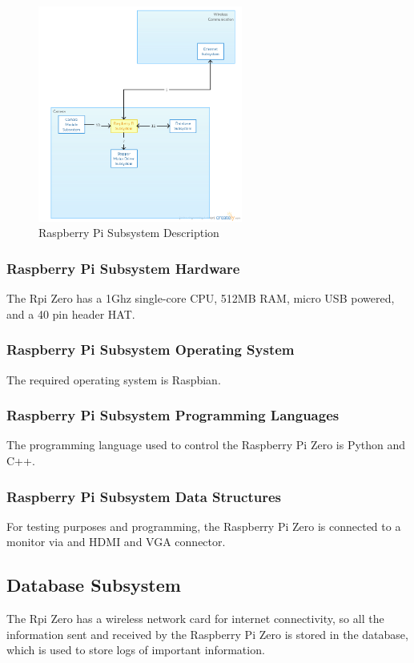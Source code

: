 \begin{figure}[h!] 
 	\centering 
  	\includegraphics[width=0.60\textwidth]{images/ADSdiagrams/raspberrypisubsystem.png} 
 \caption{Raspberry Pi Subsystem Description} 
\end{figure} 




\subsubsection{Raspberry Pi Subsystem Hardware}
The Rpi Zero has a 1Ghz single-core CPU, 512MB RAM, micro USB powered, and a 40 pin header HAT.

\subsubsection{Raspberry Pi Subsystem Operating System}
The required operating system is Raspbian.


\subsubsection{Raspberry Pi Subsystem Programming Languages}
The programming language used to control the Raspberry Pi Zero is Python and C++.

\subsubsection{Raspberry Pi Subsystem Data Structures}
For testing purposes and programming, the Raspberry Pi Zero is connected to a monitor via and HDMI and VGA connector.



\subsection{Database Subsystem}
The Rpi Zero has a wireless network card for internet connectivity, so all the information sent and received by the Raspberry Pi Zero is stored in the database, which is used to store logs of important information.


